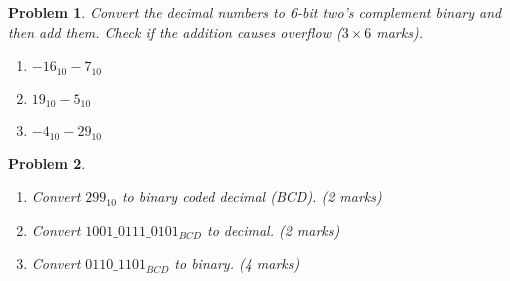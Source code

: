 \documentclass{article}
\newtheorem{prob}{Problem}
\begin{document}
\vspace{20em}

\begin{prob}
  Convert the decimal numbers to 6-bit two's complement binary and then add
  them. Check if the addition causes overflow ($3 \times 6$ marks).
  \begin{enumerate}
  \item $-16_{10} - 7_{10}$
  \item $19_{10} - 5_{10}$
  \item $-4_{10} - 29_{10}$
  \end{enumerate}
\end{prob}

\vspace{20em}

\begin{prob}
  \begin{enumerate}
  \item Convert $299_{10}$  to binary coded decimal (BCD). (2 marks)
  \item {\color{red}Convert $1001\_ 0111\_ 0101_{BCD}$  to decimal.} (2 marks)
  \item Convert $0110\_ 1101_{BCD}$  to binary. (4 marks)
  \end{enumerate}
\end{prob}

\vspace{20em}
\end{document}
